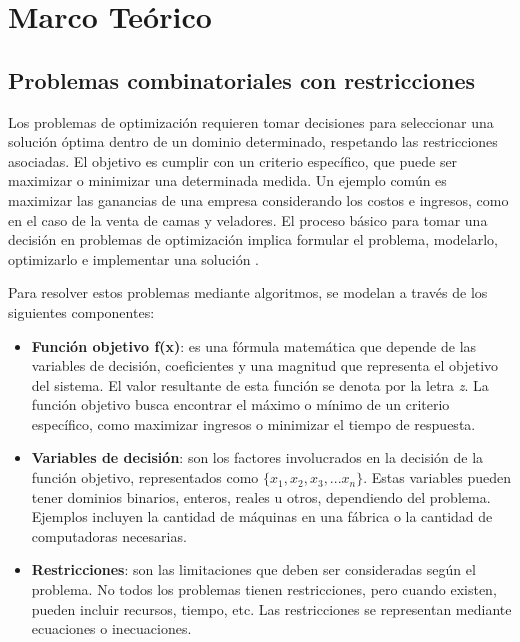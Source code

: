 
\section{Marco Teórico}
\label{sc:MC}


\subsection{Problemas combinatoriales con restricciones}

\vspace{1mm}
\normalsize

Los problemas de optimización requieren tomar decisiones para seleccionar una solución óptima dentro de un dominio determinado, respetando las restricciones asociadas. El objetivo es cumplir con un criterio específico, que puede ser maximizar o minimizar una determinada medida. Un ejemplo común es maximizar las ganancias de una empresa considerando los costos e ingresos, como en el caso de la venta de camas y veladores. El proceso básico para tomar una decisión en problemas de optimización implica formular el problema, modelarlo, optimizarlo e implementar una solución \cite{10.5555/1718024}.

Para resolver estos problemas mediante algoritmos, se modelan a través de los siguientes componentes:

\begin{itemize}
\item \textbf{Función objetivo f(x)}: es una fórmula matemática que depende de las variables de decisión, coeficientes y una magnitud que representa el objetivo del sistema. El valor resultante de esta función se denota por la letra \textit{z}. La función objetivo busca encontrar el máximo o mínimo de un criterio específico, como maximizar ingresos o minimizar el tiempo de respuesta.

    \item \textbf{Variables de decisión}: son los factores involucrados en la decisión de la función objetivo, representados como $\{x_1, x_2, x_3, ... x_n\}$. Estas variables pueden tener dominios binarios, enteros, reales u otros, dependiendo del problema. Ejemplos incluyen la cantidad de máquinas en una fábrica o la cantidad de computadoras necesarias.

    \item \textbf{Restricciones}: son las limitaciones que deben ser consideradas según el problema. No todos los problemas tienen restricciones, pero cuando existen, pueden incluir recursos, tiempo, etc. Las restricciones se representan mediante ecuaciones o inecuaciones.

\end{itemize}


